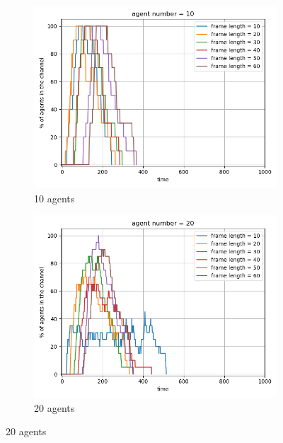 \begin{figure}[htbp]
    \centering
    \begin{subfigure}[t]{0.45\linewidth}
        \centering
        \includegraphics[width=\linewidth]{figures/channel_usage_agent10.png}
        \caption{10 agents}
        \label{fig:agentpercent1}
    \end{subfigure}
    \hfill
    \begin{subfigure}[t]{0.45\linewidth}
        \centering
        \includegraphics[width=\linewidth]{figures/channel_usage_agent20.png}
        \caption{20 agents}
        \label{fig:agentpercent2}
    \end{subfigure}
    

\end{figure}
